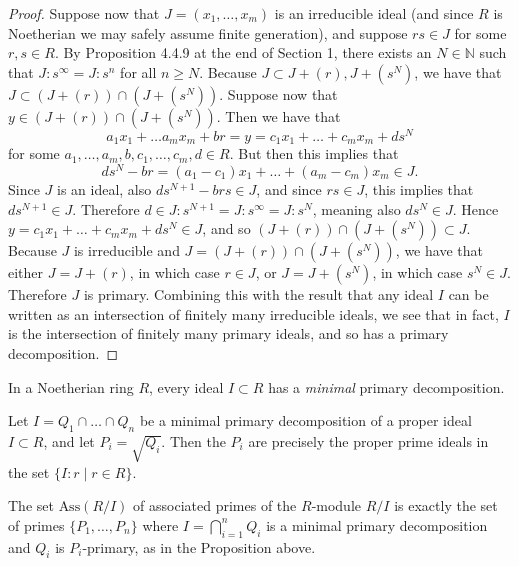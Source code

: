 \documentclass[12pt]{article}
\newenvironment{theorem}[2][Theorem]{\begin{trivlist}
\item[\hskip \labelsep {\bfseries #1}\hskip \labelsep {\bfseries #2.}]}{\end{trivlist}}
\newenvironment{corollary}[2][Corollary]{\begin{trivlist}
\item[\hskip \labelsep {\bfseries #1}\hskip \labelsep {\bfseries #2.}]}{\end{trivlist}}
\newenvironment{proposition}[2][Proposition]{\begin{trivlist}
\item[\hskip \labelsep {\bfseries #1}\hskip \labelsep {\bfseries #2.}]}{\end{trivlist}}
\newcommand{\N}{\mathbb{N}}
\newcommand{\ass}{\text{Ass}}
\begin{document}
\begin{proof}
	Suppose now that $J = (x_1, \dots, x_m)$ is an irreducible ideal (and since $R$ is Noetherian we may safely assume finite generation), and suppose $rs \in J$ for some $r,s \in R$. By Proposition 4.4.9 at the end of Section 1, there exists an $N \in \N$ such that $J: s^\infty = J: s^n$ for all $n \geq N$. Because $J \subset J + (r), J + (s^N)$, we have that $J \subset \left(J + (r)\right) \cap \left(J + (s^N) \right)$. Suppose now that $y \in \left(J + (r)\right) \cap \left(J + (s^N) \right)$. Then we have that \[ a_1 x_1 + \dots a_m x_m + br = y = c_1 x_1 + \dots + c_m x_m + ds^N \] for some $a_1, \dots, a_m, b, c_1, \dots, c_m, d \in R$. But then this implies that \[ ds^N - br = (a_1 - c_1) x_1 + \dots + (a_m - c_m) x_m \in J. \] Since $J$ is an ideal, also $ds^{N+1} - brs \in J$, and since $rs \in J$, this implies that $ds^{N+1} \in J$. Therefore $d \in J:s^{N+1} = J: s^\infty = J: s^N$, meaning also $ds^N \in J$. Hence $y = c_1 x_1 + \dots + c_m x_m + ds^N \in J$, and so $\left(J + (r)\right) \cap \left(J + (s^N) \right) \subset J$. Because $J$ is irreducible and $J = \left(J + (r)\right) \cap \left(J + (s^N) \right)$, we have that either $J = J + (r)$, in which case $r \in J$, or $J = J + (s^N)$, in which case $s^N \in J$. Therefore $J$ is primary. Combining this with the result that any ideal $I$ can be written as an intersection of finitely many irreducible ideals, we see that in fact, $I$ is the intersection of finitely many primary ideals, and so has a primary decomposition. 
\end{proof}


\begin{theorem}{4.8.7 \cite{cox2013ideals}}
	In a Noetherian ring $R$, every ideal $I \subset R$ has a \emph{minimal} primary decomposition. 
\end{theorem}


\begin{proposition}{7.17 \cite{atiyah1969introduction}}
	Let $I = Q_1 \cap \dots \cap Q_n$ be a minimal primary decomposition of a proper ideal $I \subset R$, and let $P_i = \sqrt{Q_i}$. Then the $P_i$ are precisely the proper prime ideals in the set $\{I:r \mid r \in R\}$. 
\end{proposition}


\begin{corollary}{1}
	The set $\ass(R/I)$ of associated primes of the $R$-module $R/I$ is exactly the set of primes $\{P_1, \dots, P_n\}$ where $I = \bigcap_{i = 1}^n Q_i$ is a minimal primary decomposition and $Q_i$ is $P_i$-primary, as in the Proposition above. 
\end{corollary}
\end{document}
